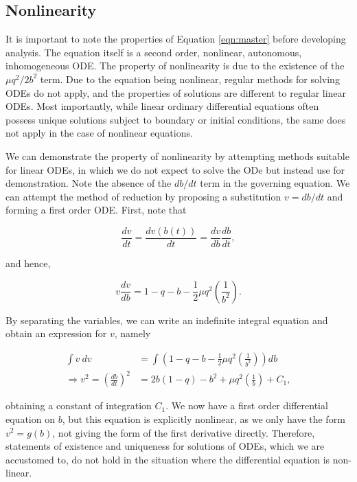 \documentclass{article}
\begin{document}
\subsection{Nonlinearity}

It is important to note the properties of Equation \ref{eqn:master} before developing analysis.
The equation itself is a second order, nonlinear, autonomous, inhomogeneous ODE.
The property of nonlinearity is due to the existence of the $\mu q^2/2b^2$ term.
Due to the equation being nonlinear, regular methods for solving ODEs do not apply,
and the properties of solutions are different to regular linear ODEs.
Most importantly, while linear ordinary differential equations often possess unique solutions subject to boundary or initial conditions,
the same does not apply in the case of nonlinear equations.

We can demonstrate the property of nonlinearity by attempting methods suitable for linear ODEs,
in which we do not expect to solve the ODe but instead use for demonstration.
Note the absence of the $db/dt$ term in the governing equation.
We can attempt the method of reduction by proposing a substitution $v=db/dt$ and forming a first order ODE.
First, note that

\begin{equation}
    \frac{dv}{dt} = \frac{dv(b(t))}{dt} = \frac{dv}{db}\frac{db}{dt},
\end{equation}

and hence,

\begin{equation}
    v \frac{dv}{db} = 1 - q - b - \frac{1}{2}\mu q^2\left( \frac{1}{b^2} \right).
\end{equation}

By separating the variables, we can write an indefinite integral equation and obtain an expression for $v$, namely

\begin{equation}
    \begin{aligned}
        \int v~dv &= \int \left(1 - q - b - \frac{1}{2}\mu q^2\left( \frac{1}{b^2} \right)\right) db \\
        \Rightarrow v^2 = \left(\frac{db}{dt}\right)^2 &= 2b(1-q) - b^2 + \mu q^2\left(\frac{1}{b}\right) + C_1,
    \end{aligned}
    \label{eqn:first_order_reduction}
\end{equation}

obtaining a constant of integration $C_1$.
We now have a first order differential equation on $b$, %
but this equation is explicitly nonlinear, as we only have the form $v^2 = g(b)$,
not giving the form of the first derivative directly.
Therefore, statements of existence and uniqueness for solutions of ODEs,
which we are accustomed to,
do not hold in the situation where the differential equation is non-linear.
\end{document}
